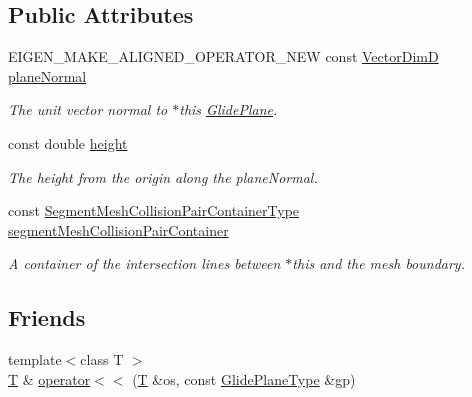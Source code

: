 \subsection*{Public Attributes}
\begin{DoxyCompactItemize}
\item 
E\+I\+G\+E\+N\+\_\+\+M\+A\+K\+E\+\_\+\+A\+L\+I\+G\+N\+E\+D\+\_\+\+O\+P\+E\+R\+A\+T\+O\+R\+\_\+\+N\+E\+W const \hyperlink{classmodel_1_1_glide_plane_a2bb10efbec7067be952e933cdeb21ce7}{Vector\+Dim\+D} \hyperlink{classmodel_1_1_glide_plane_ac67211af88d7742170cc0987ee584fd6}{plane\+Normal}
\begin{DoxyCompactList}\small\item\em The unit vector normal to $\ast$this \hyperlink{classmodel_1_1_glide_plane}{Glide\+Plane}. \end{DoxyCompactList}\item 
const double \hyperlink{classmodel_1_1_glide_plane_aa15e927f8f086dc6bdc76f485adad7ff}{height}
\begin{DoxyCompactList}\small\item\em The height from the origin along the plane\+Normal. \end{DoxyCompactList}\item 
const \hyperlink{classmodel_1_1_glide_plane_a1fba1acd8a8051c426bc1f35f8c5ea94}{Segment\+Mesh\+Collision\+Pair\+Container\+Type} \hyperlink{classmodel_1_1_glide_plane_a988884f7402e63da1de4e06ab2e8e785}{segment\+Mesh\+Collision\+Pair\+Container}
\begin{DoxyCompactList}\small\item\em A container of the intersection lines between $\ast$this and the mesh boundary. \end{DoxyCompactList}\end{DoxyCompactItemize}
\subsection*{Friends}
\begin{DoxyCompactItemize}
\item 
{\footnotesize template$<$class T $>$ }\\\hyperlink{_spline_node_base__corder1_8h_a82692d3a5502b91460591f1d5504314a}{T} \& \hyperlink{classmodel_1_1_glide_plane_ab92d90262667881bcf5a42f54128aa88}{operator$<$$<$} (\hyperlink{_spline_node_base__corder1_8h_a82692d3a5502b91460591f1d5504314a}{T} \&os, const \hyperlink{classmodel_1_1_glide_plane_af25a804a008e811823421118eb164531}{Glide\+Plane\+Type} \&gp)
\end{DoxyCompactItemize}
